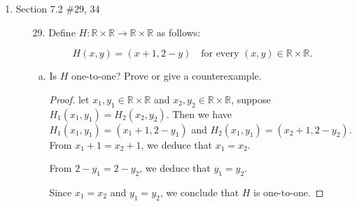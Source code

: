 \documentclass[12pt]{article}
\newcommand{\R}{\mathbb{R}}
\begin{document}
\begin{enumerate}
        \begin{enumerate}[a.]
            \item Is $C$ one-to-one? Prove or give a counterexample. 
                \begin{proof}
                    Let $s_1,s_2 \in S$, if We have $C(s_1) = as_1$, and $C(s_2) = as_2$. Suppose $C(s_1) = C(s_2)$, then we have $as_1 = as_2$. We see that this implies $s_1 = s_2$, therefore the function is one-to-one.
                \end{proof}
            \item Is $C$ onto? Prove or give a counterexample.
                \begin{proof}
                    Let $s_1 = bb$, since the image of $C$ is the set of string that starts with $a$, there does not exists $s \in S$ such that $f(s) = s_1$k, therefore the function is not surjective, or onto. 
                \end{proof}
        \end{enumerate}

    \newpage
    \item Section 7.2 \#29, 34
        \begin{enumerate}
            \item[29.] Define \( H: \mathbb{R} \times \mathbb{R} \to \mathbb{R} \times \mathbb{R} \) as follows:

                \[
                H(x,y) = (x + 1, 2 - y) \quad \text{for every } (x,y) \in \mathbb{R} \times \mathbb{R}.
                \]
                
                \begin{enumerate}[a.]
                    \item Is \( H \) one-to-one? Prove or give a counterexample.
                        \begin{proof}
                            let $x_1,y_1 \in \R \times \R$ and $x_2,y_2 \in \R \times \R$, suppose $H_1(x_1,y_1) = H_2(x_2,y_2)$. Then we have $H_1(x_1,y_1)  = (x_1 +1, 2 - y_1)$ and $H_2(x_1,y_1)  = (x_2 +1, 2 - y_2)$.
                             From $x_1 + 1 = x_2 + 1$, we deduce that $x_1 = x_2$.

                                From $2 - y_1 = 2 - y_2$, we deduce that $y_1 = y_2$.
                        
                                Since $x_1 = x_2$ and $y_1 = y_2$, we conclude that $H$ is one-to-one.
                        
                        \end{proof}
                        

\end{enumerate}
\end{enumerate}
\end{enumerate}
\end{document}
